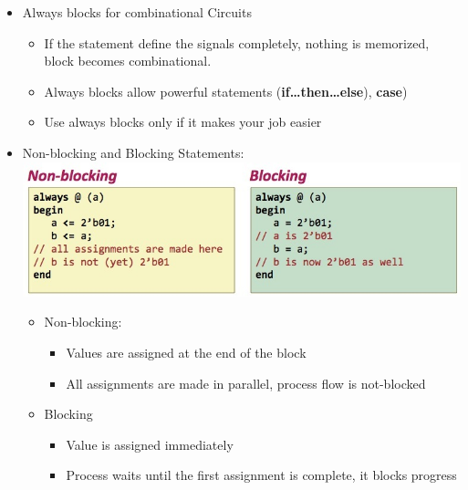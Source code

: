 \documentclass[a4paper]{article}
\begin{document}
\begin{itemize}
\begin{itemize}
\begin{itemize}
\item This process triggers only if the clk signal rises
\item Once it rises, the value of $d$ will be copied to $q$
\item ``assign'' statement is not used within always block
\item The $<=$ describes a ``non-blocking''\footnote{More on this later} assignment
\item Assigned variables need to be declared as \textbf{reg} (doesn't necessarily mean that it is a register)
\end{itemize}
\end{itemize}
\item Always blocks for combinational Circuits
\begin{itemize}
\item If the statement define the signals completely, nothing is memorized, block becomes combinational. 
\item Always blocks allow powerful statements (\textbf{if\dots then\dots else}), \textbf{case})
\item Use always blocks only if it makes your job easier
\end{itemize}
\item Non-blocking and Blocking Statements:\\\includegraphics[scale=0.45]{Figures/nonBlockingAndBlockingStatements.jpg}
\begin{itemize}
\item Non-blocking:
\begin{itemize}
\item Values are assigned at the end of the block
\item All assignments are made in parallel, process flow is not-blocked
\end{itemize}
\item Blocking
\begin{itemize}
\item Value is assigned immediately
\item Process waits until the first assignment is complete, it blocks progress

\end{itemize}
\end{itemize}
\end{itemize}
\end{document}
